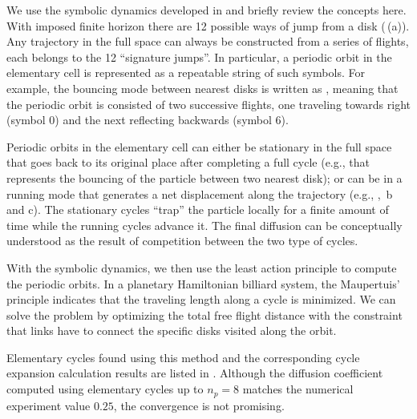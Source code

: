 \documentclass[aps,pre,
                showpacs,
                twocolumn,
                groupedaddress,
                floatfix]{revtex4-1}
\begin{document}
We use the symbolic dynamics developed in  and briefly review the concepts here. With imposed finite horizon there are 12 possible ways of jump from a disk (\,(a)). Any trajectory in the full space can always be constructed from a series of flights, each belongs to  the 12 ``signature jumps''. In particular, a periodic orbit in the elementary cell is represented as a repeatable string of such symbols. For example, the bouncing mode between nearest disks is written as , meaning that the periodic orbit is consisted of two successive flights, one traveling towards right (symbol $0$) and the next reflecting backwards (symbol $6$). 

Periodic orbits in the elementary cell can either be stationary in the full space that goes back to its original place after completing a full cycle (e.g.,  that represents the bouncing of the particle between two nearest disk); or can be in a running mode that generates a net displacement along the trajectory (e.g., , \,b and c). The stationary cycles ``trap'' the  particle locally for a finite amount of time while the running cycles advance it. The final diffusion  can be conceptually understood as the result of competition between the two type of cycles.

With the symbolic dynamics, we then use the least action principle to compute the periodic orbits. In a planetary Hamiltonian billiard system, the Maupertuis' principle indicates that the traveling length along a cycle is minimized. We can solve the problem by optimizing the total free flight distance with the constraint that links have to connect the specific disks visited along the orbit. 

Elementary cycles found using this method and the corresponding cycle expansion calculation results are listed in . Although the diffusion coefficient computed using elementary cycles up to $n_p = 8$ matches the numerical experiment value $0.25$, the convergence is not promising.
\end{document}
